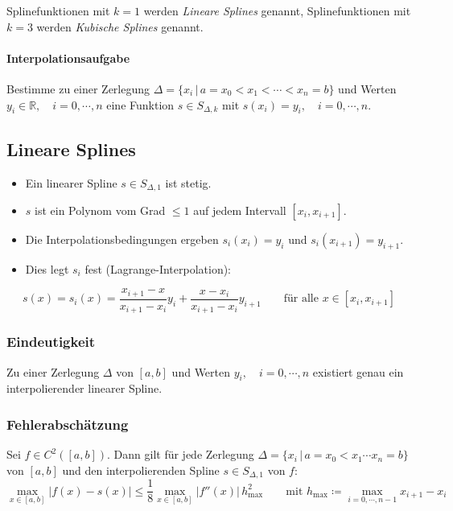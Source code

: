\documentclass[a4paper, 11pt, accentcolor = tud3b]{tudreport}
\newcommand{\forwhich}{\ensuremath{{\,\vert\,}}}
\newcommand{\abs}[1]{\ensuremath{{\lvert #1 \rvert}}}
\newcommand{\R}{\ensuremath{\mathbb{R}}}
\begin{document}
		        Splinefunktionen mit \(k = 1\) werden \textit{Lineare Splines} genannt, Splinefunktionen mit \(k = 3\) werden \textit{Kubische Splines} genannt.
	        
	        \paragraph{Interpolationsaufgabe}
		        Bestimme zu einer Zerlegung \(\Delta = \{ x_i \forwhich a = x_0 < x_1 < \cdots < x_n = b \} \) und Werten \( y_i \in \R, \quad i = 0, \cdots, n \) eine Funktion \( s \in S_{\Delta, k} \) mit \( s(x_i) = y_i, \quad i = 0, \cdots, n \).
	
	        \subsection{Lineare Splines}
	            \begin{itemize}
	            	\item Ein linearer Spline \( s \in S_{\Delta, 1} \) ist stetig.
	            	\item \(s\) ist ein Polynom vom Grad \(\leq 1\) auf jedem Intervall \( [x_i, x_{i+1}] \).
	            	\item Die Interpolationsbedingungen ergeben \( s_i(x_i) = y_i \) und \( s_i(x_{i+1}) = y_{i+1} \).
	            	\item Dies legt \(s_i\) fest (Lagrange-Interpolation):
	            \end{itemize}
	            \begin{equation*}
		            s(x) = s_i(x) = \frac{x_{i+1} - x}{x_{i+1} - x_i} y_i + \frac{x-x_i}{x_{i+1}-x_i} y_{i+1} \qquad \textrm{für alle } x \in [x_i, x_{i+1}]
	            \end{equation*}
	
				\subsubsection{Eindeutigkeit}
					Zu einer Zerlegung \(\Delta\) von \( [a, b] \) und Werten \( y_i, \quad i = 0, \cdots, n \) existiert genau ein interpolierender linearer Spline.
	
	            \subsubsection{Fehlerabschätzung}
	                Sei \( f \in C^2([a, b]) \). Dann gilt für jede Zerlegung \( \Delta = \{ x_i \forwhich a = x_0 < x_1 \cdots x _ n = b \} \) von \([a,b]\) und den interpolierenden Spline \( s \in S_{\Delta, 1} \) von \(f\):
	                \begin{equation*}
		                \max_{x \in [a, b]} \abs{f(x) - s(x)} \leq \frac{1}{8} \max_{x \in [a, b]} \abs{f''(x)} \, h_\textrm{max}^2 \qquad \textrm{mit } h_\textrm{max} \coloneqq \max_{i = 0, \cdots, n - 1} x_{i+1} - x_i
	                \end{equation*}
	
\end{document}
